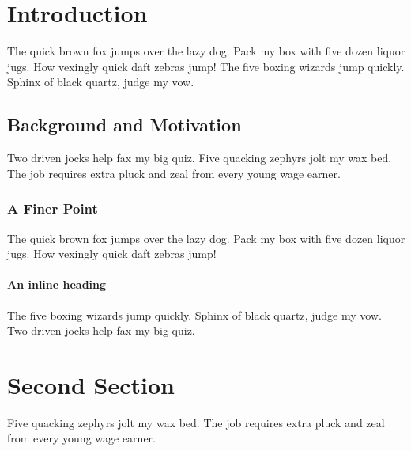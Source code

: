 \documentclass[acmsmall,nonacm]{acmart}
\begin{document}
\section{Introduction}
The quick brown fox jumps over the lazy dog. Pack my box with five dozen
liquor jugs. How vexingly quick daft zebras jump! The five boxing wizards
jump quickly. Sphinx of black quartz, judge my vow.

\subsection{Background and Motivation}
Two driven jocks help fax my big quiz. Five quacking zephyrs jolt my wax bed.
The job requires extra pluck and zeal from every young wage earner.

\subsubsection{A Finer Point}
The quick brown fox jumps over the lazy dog. Pack my box with five dozen
liquor jugs. How vexingly quick daft zebras jump!

\paragraph{An inline heading}
The five boxing wizards jump quickly. Sphinx of black quartz, judge my vow.
Two driven jocks help fax my big quiz.

\section{Second Section}
Five quacking zephyrs jolt my wax bed. The job requires extra pluck and zeal
from every young wage earner.
\end{document}
